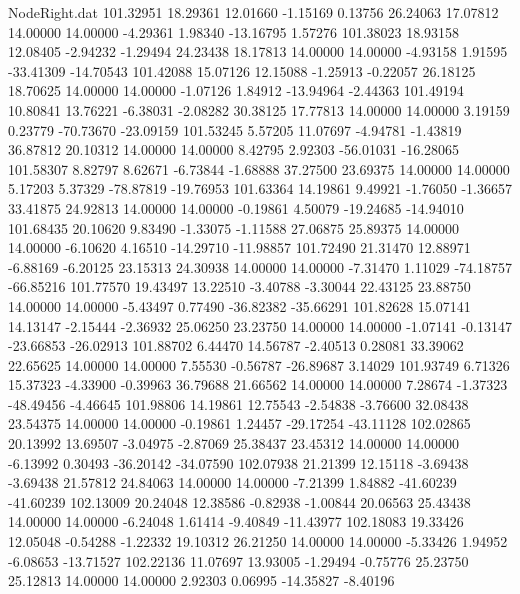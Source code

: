 \begin{filecontents}{NodeRight.dat}
 101.32951   18.29361   12.01660    -1.15169    0.13756   26.24063   17.07812   14.00000   14.00000   -4.29361    1.98340  -13.16795    1.57276
 101.38023   18.93158   12.08405    -2.94232   -1.29494   24.23438   18.17813   14.00000   14.00000   -4.93158    1.91595  -33.41309  -14.70543
 101.42088   15.07126   12.15088    -1.25913   -0.22057   26.18125   18.70625   14.00000   14.00000   -1.07126    1.84912  -13.94964   -2.44363
 101.49194   10.80841   13.76221    -6.38031   -2.08282   30.38125   17.77813   14.00000   14.00000    3.19159    0.23779  -70.73670  -23.09159
 101.53245    5.57205   11.07697    -4.94781   -1.43819   36.87812   20.10312   14.00000   14.00000    8.42795    2.92303  -56.01031  -16.28065
 101.58307    8.82797    8.62671    -6.73844   -1.68888   37.27500   23.69375   14.00000   14.00000    5.17203    5.37329  -78.87819  -19.76953
 101.63364   14.19861    9.49921    -1.76050   -1.36657   33.41875   24.92813   14.00000   14.00000   -0.19861    4.50079  -19.24685  -14.94010
 101.68435   20.10620    9.83490    -1.33075   -1.11588   27.06875   25.89375   14.00000   14.00000   -6.10620    4.16510  -14.29710  -11.98857
 101.72490   21.31470   12.88971    -6.88169   -6.20125   23.15313   24.30938   14.00000   14.00000   -7.31470    1.11029  -74.18757  -66.85216
 101.77570   19.43497   13.22510    -3.40788   -3.30044   22.43125   23.88750   14.00000   14.00000   -5.43497    0.77490  -36.82382  -35.66291
 101.82628   15.07141   14.13147    -2.15444   -2.36932   25.06250   23.23750   14.00000   14.00000   -1.07141   -0.13147  -23.66853  -26.02913
 101.88702    6.44470   14.56787    -2.40513    0.28081   33.39062   22.65625   14.00000   14.00000    7.55530   -0.56787  -26.89687    3.14029
 101.93749    6.71326   15.37323    -4.33900   -0.39963   36.79688   21.66562   14.00000   14.00000    7.28674   -1.37323  -48.49456   -4.46645
 101.98806   14.19861   12.75543    -2.54838   -3.76600   32.08438   23.54375   14.00000   14.00000   -0.19861    1.24457  -29.17254  -43.11128
 102.02865   20.13992   13.69507    -3.04975   -2.87069   25.38437   23.45312   14.00000   14.00000   -6.13992    0.30493  -36.20142  -34.07590
 102.07938   21.21399   12.15118    -3.69438   -3.69438   21.57812   24.84063   14.00000   14.00000   -7.21399    1.84882  -41.60239  -41.60239
 102.13009   20.24048   12.38586    -0.82938   -1.00844   20.06563   25.43438   14.00000   14.00000   -6.24048    1.61414   -9.40849  -11.43977
 102.18083   19.33426   12.05048    -0.54288   -1.22332   19.10312   26.21250   14.00000   14.00000   -5.33426    1.94952   -6.08653  -13.71527
 102.22136   11.07697   13.93005    -1.29494   -0.75776   25.23750   25.12813   14.00000   14.00000    2.92303    0.06995  -14.35827   -8.40196

\end{filecontents}
